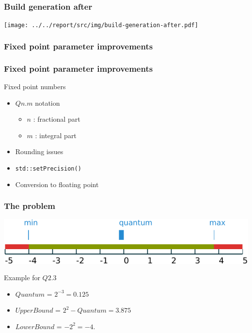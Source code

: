 \begin{frame}
    \frametitle{Build generation after}
    \centering
    \texttt{[image: ../../report/src/img/build-generation-after.pdf]}
\end{frame}

\subsubsection{Fixed point parameter improvements}
\begin{frame}
    \frametitle{Fixed point parameter improvements}
    \begin{block}{Fixed point numbers}
        \begin{itemize}
            \item $Qn.m$ notation
                \begin{itemize}
                    \item $n$ : fractional part
                    \item $m$ : integral part
                \end{itemize}
            \item Rounding issues
            \item \lstinline{std::setPrecision()}
            \item Conversion to floating point
        \end{itemize}
    \end{block}
\end{frame}

\begin{frame}
    \frametitle{The problem}
    \begin{minipage}{\textwidth}
        \flushright
        \includegraphics[width=\textwidth]{../../report/src/img/fixedPoint.pdf}
    \end{minipage}
    \begin{minipage}{\textwidth}
        \begin{block}{Example for $Q2.3$}
            \begin{itemize}
                \item $Quantum$ = $2^{-3} = 0.125$
                \item $UpperBound$ = $2^2 - Quantum = 3.875$
                \item $LowerBound$ = $-2^2 = -4$.
            \end{itemize}
        \end{block}
    \end{minipage}
\end{frame}

